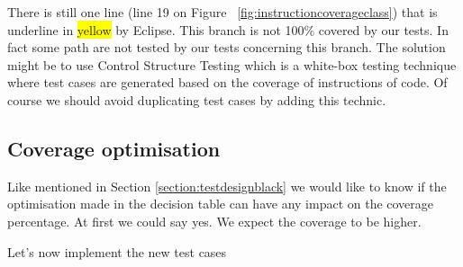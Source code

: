 \documentclass{article}
\begin{document}
    There is still one line (line 19 on Figure ~\ref{fig:instructioncoverageclass}) that is underline in \colorbox{yellow}{yellow} by Eclipse.
    This branch is not 100\% covered by our tests. In fact some path are not tested by our tests concerning this branch.
    The solution might be to use Control Structure Testing which is a white-box testing technique where test cases are
    generated based on the coverage of instructions of code. Of course we should avoid duplicating test cases by adding this technic.
    
    \subsection{Coverage optimisation}

    Like mentioned in Section \ref{section:testdesignblack} we would like to know if the optimisation made in the decision table can have any impact
    on the coverage percentage. At first we could say yes. We expect the coverage to be higher.

    \bigskip

    Let's now implement the new test cases
\end{document}
